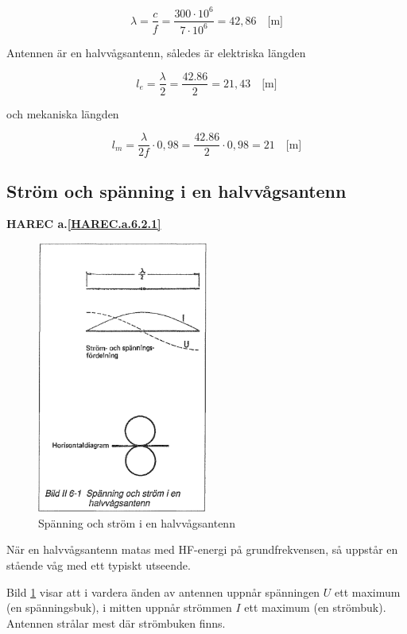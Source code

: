 \[
\lambda = \frac{c}{f} = \frac{300 \cdot 10^6}{7 \cdot 10^6} = 42,86
\quad \text{[m]}
\]

Antennen är en halvvågsantenn, således är elektriska längden

\[
l_e = \frac{\lambda}{2} = \frac{42.86}{2} = 21,43 \quad \text{[m]}
\]

och mekaniska längden

\[
l_m = \frac{\lambda}{2f} \cdot 0,98 = \frac{42.86}{2}\cdot 0,98 = 21
\quad \text{[m]}
\]


\subsection{Ström och spänning i en halvvågsantenn}
\textbf{
HAREC a.\ref{HAREC.a.6.2.1}\label{myHAREC.a.6.2.1}
}

\begin{figure}
  \includegraphics[width=0.5\textwidth]{images/bild_2_6-01}
  \caption{Spänning och ström i en halvvågsantenn}
  \label{fig:bildII6-1}
\end{figure}

När en halvvågsantenn matas med HF-energi på grundfrekvensen, så
uppstår en stående våg med ett typiskt utseende.

Bild \ref{fig:bildII6-1} visar att i vardera änden av antennen uppnår spänningen
\(U\) ett maximum (en spänningsbuk), i mitten uppnår strömmen \(I\)
ett maximum (en strömbuk).  Antennen strålar mest där strömbuken
finns.

